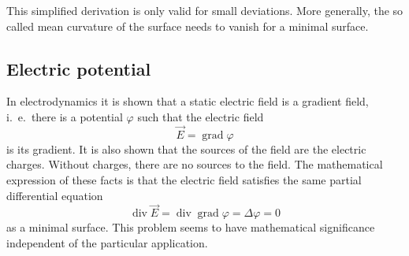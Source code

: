 This simplified derivation is only valid for small deviations.
More generally, the so called mean curvature of the surface needs
to vanish for a minimal surface.

\subsection{Electric potential}
In electrodynamics it is shown that a static electric field is a 
gradient field, i.~e.~there is a potential $\varphi$ such that the
electric field
\[
\vec E=\operatorname{grad}\varphi
\]
is its gradient.
It is also shown that the sources of the field are the electric charges.
Without charges, there are no sources to the field.
The mathematical expression of these facts is that 
the electric field satisfies the same partial differential equation
\[
\operatorname{div}\vec E=\operatorname{div}\operatorname{grad}\varphi
=\Delta \varphi=0
\]
as a minimal surface.
This problem seems to have mathematical significance independent of the
particular application.

